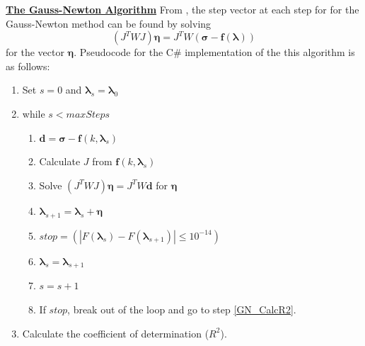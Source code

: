 \documentclass[12pt, a4paper, notitlepage]{article}
\numberwithin{equation}{subsection}
\numberwithin{figure}{subsection}
\numberwithin{table}{subsection}
\newcommand{\lambdaVect}{\pmb{\lambda}}
\begin{document}
\textbf{\underline{The Gauss-Newton Algorithm}}
\newline
From \cite{Gavin}, the step vector at each step for for the Gauss-Newton method can be found by solving 
\begin{equation}
    (J^T W J) \pmb{\eta} = J^T W (\pmb{\sigma} - \pmb{f}(\lambdaVect))
\end{equation}
for the vector $\pmb{\eta}$.  Pseudocode for the C\# implementation of the this algorithm is as follows:
\begin{enumerate}
	\item Set $s = 0$ and $\lambdaVect_s = \lambdaVect_0$
    \item while $s < maxSteps$
      \begin{enumerate}
          \item $\pmb{d} = \pmb{\sigma} - \pmb{f}(k,\lambdaVect_{s})$
          \item Calculate $J$ from $\pmb{f}(k,\lambdaVect_{s})$
          \item Solve $(J^T W J) \pmb{\eta} = J^T W \pmb{d}$ for $\pmb{\eta}$
          \item $\lambdaVect_{s+1} = \lambdaVect_{s} + \pmb{\eta}$
          \item $stop = (|F(\lambdaVect_{s}) - F(\lambdaVect_{s+1})| \leq 10^{-14})$
          \item $\lambdaVect_{s} = \lambdaVect_{s+1}$
          \item $s = s + 1$
          \item If $stop$, break out of the loop and go to step \ref{GN_CalcR2}.
      \end{enumerate}
    \item Calculate the coefficient of determination ($R^2$).\label{GN_CalcR2}
\end{enumerate}
\end{document}
